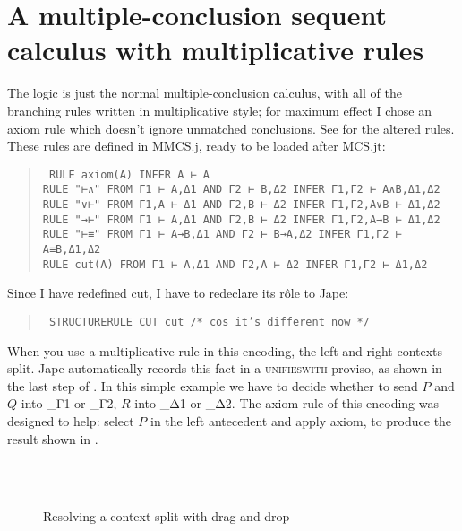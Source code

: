 \section{A multiple-conclusion sequent calculus with multiplicative rules}

The logic is just the normal multiple-conclusion calculus, with all of the branching rules written in multiplicative style; for maximum effect I chose an axiom rule which doesn't ignore unmatched conclusions. See  for the altered rules. These rules are defined in MMCS.j, ready to be loaded after MCS.jt:
\begin{quote}\tt\small
RULE    axiom(A)                                    INFER A ⊢ A\\
RULE    "⊢∧"        FROM Γ1 ⊢ A,Δ1 AND Γ2 ⊢ B,Δ2        INFER Γ1,Γ2 ⊢ A∧B,Δ1,Δ2\\
RULE    "∨⊢"        FROM Γ1,A ⊢ Δ1 AND Γ2,B ⊢ Δ2        INFER Γ1,Γ2,A∨B ⊢ Δ1,Δ2\\
RULE    "→⊢"        FROM Γ1 ⊢ A,Δ1 AND Γ2,B ⊢ Δ2        INFER Γ1,Γ2,A→B ⊢ Δ1,Δ2\\
RULE    "⊢≡"        FROM Γ1 ⊢ A→B,Δ1 AND Γ2 ⊢ B→A,Δ2  INFER Γ1,Γ2 ⊢ A≡B,Δ1,Δ2\\
RULE    cut(A)        FROM Γ1 ⊢ A,Δ1 AND Γ2,A ⊢ Δ2        INFER Γ1,Γ2 ⊢ Δ1,Δ2
\end{quote}

Since I have redefined cut, I have to redeclare its r\^{o}le to Jape:
\begin{quote}\tt\small
STRUCTURERULE CUT                   cut /* cos it's different now */
\end{quote}

When you use a multiplicative rule in this encoding, the left and right contexts split. Jape automatically records this fact in a \textsc{unifieswith} proviso, as shown in the last step of . In this simple example we have to decide whether to send $P$ and $Q$ into \_Γ1 or \_Γ2, $R$ into \_Δ1 or \_Δ2. The axiom rule of this encoding was designed to help: select $P$ in the left antecedent and apply axiom, to produce the result shown in .

\begin{figure}
\centering
{}\\
\\
\caption{Resolving a context split with drag-and-drop}
\label{fig:dragstages}
\end{figure}



